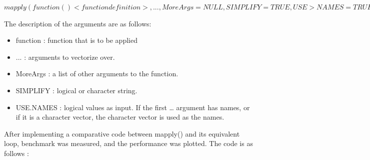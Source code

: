 \documentclass{article}
\begin{document}
$mapply(function(){<function definition>}, ..., MoreArgs = NULL, SIMPLIFY = TRUE, USE>NAMES = TRUE
)$

The description of the arguments are as follows: \leavevmode\newline
\begin{itemize}
	\item	function : function that is to be applied
	\item	... : arguments to vectorize over.
	\item	MoreArgs : a list of other arguments to the function.
	\item	SIMPLIFY : logical or character string.
	\item	USE.NAMES : logical values as input. If the first … argument has names, or if it is a character vector, the character vector is used as the names.
\end{itemize}
After implementing a comparative code between mapply() and its equivalent loop, benchmark was measured, and the performance was plotted. The code is as follows :

\lstset{language=R}
\end{document}
